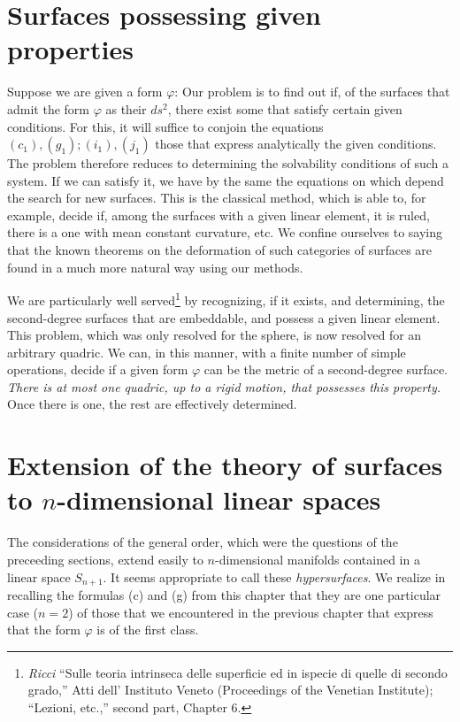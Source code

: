 \documentclass{book}
\begin{document}
\section{Surfaces possessing given properties}

Suppose we are given a form $\varphi$: Our problem is to find out if, of the surfaces that admit the form $\varphi$ as their $ds^2$, there exist some that satisfy certain given conditions. For this, it will suffice to conjoin the equations $(c_1),(g_1);(i_1),(j_1)$ those that express analytically the given conditions. The problem therefore reduces to determining the solvability conditions of such a system. If we can satisfy it, we have by the same the equations on which depend the search for new surfaces. This is the classical method, which is able to, for example, decide if, among the surfaces with a given linear element, it is ruled, there is a one with mean constant curvature, etc. We confine ourselves to saying that the known theorems on the deformation of such categories of surfaces are found in a much more natural way using our methods.

We are particularly well served\footnote{\emph{Ricci} ``Sulle teoria intrinseca delle superficie ed in ispecie di quelle di secondo grado,'' Atti dell' Instituto Veneto (Proceedings of the Venetian Institute); ``Lezioni, etc.,'' second part, Chapter 6.} by recognizing, if it exists, and determining, the second-degree surfaces that are embeddable, and possess a given linear element. This problem, which was only resolved for the sphere, is now resolved for an arbitrary quadric. We can, in this manner, with a finite number of simple operations, decide if a given form $\varphi$ can be the metric of a second-degree surface. \emph{There is at most one quadric, up to a rigid motion, that possesses this property.} Once there is one, the rest are effectively determined.

\section{Extension of the theory of surfaces to $n$-dimensional linear spaces}

The considerations of the general order, which were the questions of the preceeding sections, extend easily to $n$-dimensional manifolds contained in a linear space $S_{n+1}$. It seems appropriate to call these \emph{hypersurfaces}. We realize in recalling the formulas (c) and (g) from this chapter that they are one particular case ($n=2$) of those that we encountered in the previous chapter that express that the form $\varphi$ is of the first class.
\end{document}
